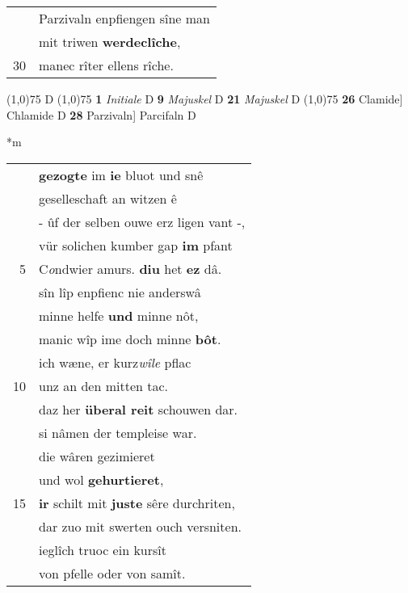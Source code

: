 \documentclass[8pt,a4paper,notitlepage]{article}
\begin{document}
\begin{table}[ht]
\begin{minipage}[t]{0.5\linewidth}
\begin{tabular}{rl}
 & Parzivaln enpfiengen sîne man\\ 
 & mit triwen \textbf{werdeclîche},\\ 
30 & manec rîter ellens rîche.\\ 
\end{tabular}
\scriptsize
\line(1,0){75} \newline
D \newline
\line(1,0){75} \newline
\textbf{1} \textit{Initiale} D  \textbf{9} \textit{Majuskel} D  \textbf{21} \textit{Majuskel} D  \newline
\line(1,0){75} \newline
\textbf{26} Clamide] Chlamide D \textbf{28} Parzivaln] Parcifaln D \newline
\end{minipage}
\hspace{0.5cm}
\begin{minipage}[t]{0.5\linewidth}
\small
\begin{center}*m
\end{center}
\begin{tabular}{rl}
 & \textbf{gezogte} im \textbf{ie} bluot und snê\\ 
 & geselleschaft an witzen ê\\ 
 & - ûf der selben ouwe erz ligen vant -,\\ 
 & vür solichen kumber gap \textbf{im} pfant\\ 
5 & C\textit{o}ndwier amurs. \textbf{diu} het \textbf{ez} dâ.\\ 
 & sîn lîp enpfienc nie anderswâ\\ 
 & minne helfe \textbf{und} minne nôt,\\ 
 & manic wîp ime doch minne \textbf{bôt}.\\ 
 & ich wæne, er kurz\textit{wîle} pflac\\ 
10 & unz an den mitten tac.\\ 
 & daz her \textbf{überal reit} schouwen dar.\\ 
 & si nâmen der templeise war.\\ 
 & die wâren gezimieret\\ 
 & und wol \textbf{gehurtieret},\\ 
15 & \textbf{ir} schilt mit \textbf{juste} sêre durchriten,\\ 
 & dar zuo mit swerten ouch versniten.\\ 
 & ieglîch truoc ein kursît\\ 
 & von pfelle oder von samît.\\ 

\end{tabular}
\end{minipage}
\end{table}
\end{document}
